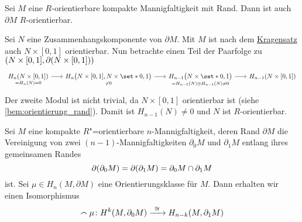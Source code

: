 \begin{lemma}[{name=[Orientierbarkeit des Randes]}]
	Sei $M$ eine $R$-orientierbare kompakte Mannigfaltigkeit mit Rand.
	Dann ist auch $\partial M$ $R$-orientierbar.
\end{lemma}
\begin{beweis}
	Sei $N$ eine Zusammenhangskomponente von $\partial M$.
	Mit $M$ ist nach dem \hyperref[kragensatz]{Kragensatz} auch $N \times [0,1]$ orientierbar.
	Nun betrachte einen Teil der Paarfolge zu $\enbrace*{N \times [0,1], \partial (N \times [0,1])}$
	\[
		\begin{tikzcd}[sep=1.8em]
			\underset{=H_n(N)=0}{H_n(N \times [0,1])} \rar & \underset{\neq 0}{H_n \enbrace[\big]{N \times [0,1], N \times \set*{0,1}}} \rar & \underset{= H_{n-1}(N) \oplus H_{n-1}(N) \neq 0}{H_{n-1} \enbrace[\big]{N \times \set*{0,1}}} \rar & H_{n-1} \enbrace*{N \times [0,1]}
		\end{tikzcd}
	\]
	Der zweite Modul ist nicht trivial, da $N \times [0,1]$ orientierbar ist (siehe \autoref{bem:orientierung_rand}).
	Damit ist $H_{n-1}(N)\neq 0$ und $N$ ist $R$-orientierbar.
\end{beweis}
\begin{satz}[{name={Poincaré-Dualität für Mannigfaltigkeiten mit Rand}}]
	Sei $M$ eine kompakte $R$"=orientierbare $n$-Mannigfaltigkeit, deren Rand $\partial M$ die Vereinigung von zwei $(n-1)$-Mannigfaltigkeiten $\partial_0 M$ und $\partial_1 M$ entlang ihres gemeinsamen Randes 
	\[
		\partial \enbrace*{\partial_0 M } = \partial \enbrace*{\partial_1 M} = \partial_0 M \cap \partial_1 M
	\]
	ist.
	Sei $\mu \in H_n(M, \partial M)$ eine Orientierungsklasse für $M$. 
	Dann erhalten wir einen Isomorphismus 
	\[
		\capp \mu \colon H^k \enbrace*{M, \partial_0 M} \grenzw{\cong} H_{n-k} \enbrace*{M, \partial_1 M}
	\]
\end{satz}
